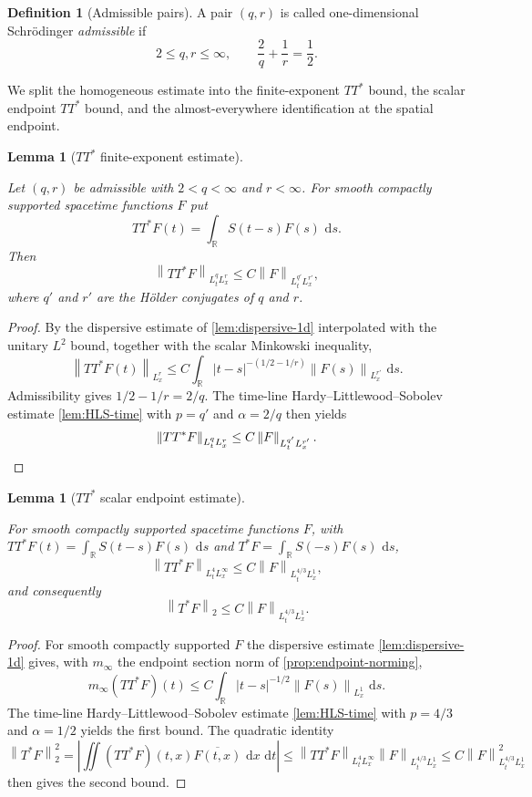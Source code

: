 \documentclass[11pt,oneside]{book}
\providecommand{\uses}[1]{}
\newtheorem{lemma}[theorem]{Lemma}
\theoremstyle{definition}
\newtheorem{definition}[theorem]{Definition}
\theoremstyle{remark}
\newcommand{\R}{\mathbb R}
\newcommand{\1}{\mathbf 1}
\newcommand{\dd}{\,\mathrm d}
\newcommand{\norm}[1]{\left\lVert #1\right\rVert}
\begin{document}
\begin{definition}[Admissible pairs]\label{def:admissible-pairs}
A pair $(q,r)$ is called one-dimensional Schr\"odinger \emph{admissible} if
\[
  2\le q,r\le\infty,
  \qquad \frac2q+\frac1r=\frac12.
\]
\end{definition}

We split the homogeneous estimate into the finite-exponent $TT^*$ bound, the scalar endpoint $TT^*$ bound, and the almost-everywhere identification at the spatial endpoint.

\begin{lemma}[$TT^*$ finite-exponent estimate]\label{lem:TTstar-finite}
\uses{def:admissible-pairs, def:propagator, def:scalar-mixed-norm}
Let $(q,r)$ be admissible with $2<q<\infty$ and $r<\infty$. For smooth compactly supported spacetime functions $F$ put
\[
 TT^*F(t)=\int_\R S(t-s)F(s)\,\dd s .
\]
Then
\[
 \norm{TT^*F}_{L^q_tL^r_x}
 \le C\norm F_{L^{q'}_tL^{r'}_x},
\]
where $q'$ and $r'$ are the H\"older conjugates of $q$ and $r$.
\end{lemma}

\begin{proof}
\uses{lem:dispersive-1d, lem:HLS-time, lem:propagator-compatibility}
By the dispersive estimate of \cref{lem:dispersive-1d} interpolated with the unitary $L^2$ bound, together with the scalar Minkowski inequality,
\[
 \norm{TT^*F(t)}_{L^r_x}
 \le C\int_\R|t-s|^{-(1/2-1/r)}
              \norm{F(s)}_{L^{r'}_x}\,\dd s .
\]
Admissibility gives $1/2-1/r=2/q$. The time-line Hardy--Littlewood--Sobolev estimate \cref{lem:HLS-time} with $p=q'$ and $\alpha=2/q$ then yields
\[
 \norm{TT^*F}_{L^q_tL^r_x}
 \le C\norm F_{L^{q'}_tL^{r'}_x}. \qedhere
\]
\end{proof}

\begin{lemma}[$TT^*$ scalar endpoint estimate]\label{lem:TTstar-endpoint}
\uses{def:propagator, def:scalar-mixed-norm}
For smooth compactly supported spacetime functions $F$, with
$TT^*F(t)=\int_\R S(t-s)F(s)\,\dd s$ and
$T^*F=\int_\R S(-s)F(s)\,\dd s$,
\[
 \norm{TT^*F}_{L^4_tL^\infty_x}
 \le C\norm F_{L^{4/3}_tL^1_x},
\]
and consequently
\[
 \norm{T^*F}_2\le C\norm F_{L^{4/3}_tL^1_x}.
\]
\end{lemma}

\begin{proof}
\uses{lem:dispersive-1d, lem:HLS-time, prop:endpoint-norming}
For smooth compactly supported $F$ the dispersive estimate \cref{lem:dispersive-1d} gives, with $m_\infty$ the endpoint section norm of \cref{prop:endpoint-norming},
\[
 m_\infty(TT^*F)(t)
 \le C\int_\R|t-s|^{-1/2}\norm{F(s)}_{L^1_x}\,\dd s .
\]
The time-line Hardy--Littlewood--Sobolev estimate \cref{lem:HLS-time} with $p=4/3$ and $\alpha=1/2$ yields the first bound. The quadratic identity
\[
 \norm{T^*F}_2^2
 =\left|\iint (TT^*F)(t,x)\overline{F(t,x)}\,\dd x\,\dd t\right|
 \le \norm{TT^*F}_{L^4_tL^\infty_x}\norm F_{L^{4/3}_tL^1_x}
 \le C\norm F_{L^{4/3}_tL^1_x}^2
\]
then gives the second bound.
\end{proof}
\end{document}
